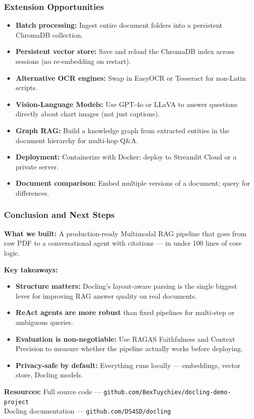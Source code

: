 \begin{frame}[fragile]\frametitle{Extension Opportunities}
      \begin{itemize}
        \item \textbf{Batch processing:} Ingest entire document folders into a persistent ChromaDB collection.
        \item \textbf{Persistent vector store:} Save and reload the ChromaDB index across sessions (no re-embedding on restart).
        \item \textbf{Alternative OCR engines:} Swap in EasyOCR or Tesseract for non-Latin scripts.
        \item \textbf{Vision-Language Models:} Use GPT-4o or LLaVA to answer questions directly about chart images (not just captions).
        \item \textbf{Graph RAG:} Build a knowledge graph from extracted entities in the document hierarchy for multi-hop Q\&A.
        \item \textbf{Deployment:} Containerize with Docker; deploy to Streamlit Cloud or a private server.
        \item \textbf{Document comparison:} Embed multiple versions of a document; query for differences.
      \end{itemize}
\end{frame}

\begin{frame}[fragile]\frametitle{Conclusion and Next Steps}

\textbf{What we built:} A production-ready Multimodal RAG pipeline that goes from raw PDF to a conversational agent with citations --- in under 100 lines of core logic.

\vspace{0.4em}
\textbf{Key takeaways:}
\begin{itemize}
  \item \textbf{Structure matters:} Docling's layout-aware parsing is the single biggest lever for improving RAG answer quality on real documents.
  \item \textbf{ReAct agents are more robust} than fixed pipelines for multi-step or ambiguous queries.
  \item \textbf{Evaluation is non-negotiable:} Use RAGAS Faithfulness and Context Precision to measure whether the pipeline actually works before deploying.
  \item \textbf{Privacy-safe by default:} Everything runs locally --- embeddings, vector store, Docling models.
\end{itemize}

\vspace{0.3em}
\textbf{Resources:} Full source code --- \texttt{github.com/BexTuychiev/docling-demo-project} \\
Docling documentation --- \texttt{github.com/DS4SD/docling}

\end{frame}